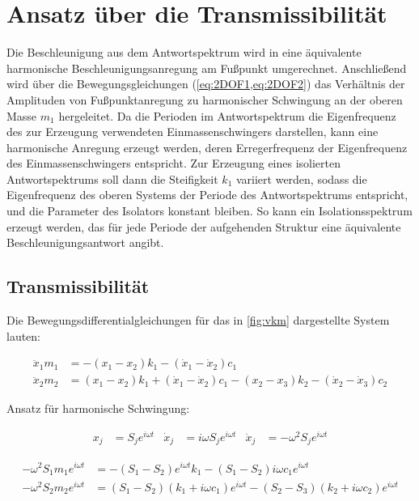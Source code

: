 \pagebreak

\section{Ansatz über die Transmissibilität}
\label{sec:ansatztrasnm}

Die Beschleunigung aus dem Antwortspektrum wird in eine äquivalente harmonische Beschleunigungsanregung am Fußpunkt umgerechnet.
Anschließend wird über die Bewegungsgleichungen (\cref{eq:2DOF1,eq:2DOF2}) das Verhältnis der Amplituden von Fußpunktanregung zu harmonischer Schwingung an der oberen Masse $m_1$ hergeleitet.
Da die Perioden im Antwortspektrum die Eigenfrequenz des zur Erzeugung verwendeten Einmassenschwingers darstellen, kann eine harmonische Anregung erzeugt werden, deren Erregerfrequenz der Eigenfrequenz des Einmassenschwingers entspricht.
Zur Erzeugung eines isolierten Antwortspektrums soll dann die Steifigkeit $k_1$ variiert werden, sodass die Eigenfrequenz des oberen Systems der Periode des Antwortspektrums entspricht, und die Parameter des Isolators konstant bleiben.
So kann ein Isolationsspektrum erzeugt werden, das für jede Periode der aufgehenden Struktur eine äquivalente Beschleunigungsantwort angibt.

\subsection{Transmissibilität}
\label{sec:transm}

Die Bewegungsdifferentialgleichungen für das in \cref{fig:vkm} dargestellte System lauten:

\begin{align}
\ddot x_1 m_1 &= -(x_1 - x_2) k_1 -(\dot x_1 - \dot x_2) c_1 \label{eq:BewegDGL1}\\
\ddot x_2 m_2 &= (x_1 - x_2) k_1 + (\dot x_1 - \dot x_2) c_1 - (x_2 - x_3) k_2 - (\dot x_2 - \dot x_3) c_2 \label{eq:BewegDGL2}
\end{align}

Ansatz für harmonische Schwingung:

\begin{align*}
x_j &= S_j e^{i \omega t} & \dot x_j &= i \omega S_j e^{i \omega t} & \ddot x_j &= - \omega^2 S_j e^{i \omega t}
\end{align*}

\begin{align}
- \omega^2 S_1 m_1 e^{i \omega t} &= - (S_1 - S_2) e^{i \omega t} k_1 - (S_1 - S_2) i \omega c_1 e^{i \omega t} \label{eq:2DOF1} \\
- \omega^2 S_2 m_2 e^{i \omega t} &= (S_1 - S_2)(k_1 + i \omega c_1) e^{i \omega t} - (S_2 - S_3)(k_2 + i \omega c_2) e^{i \omega t} \label{eq:2DOF2}
\end{align}

